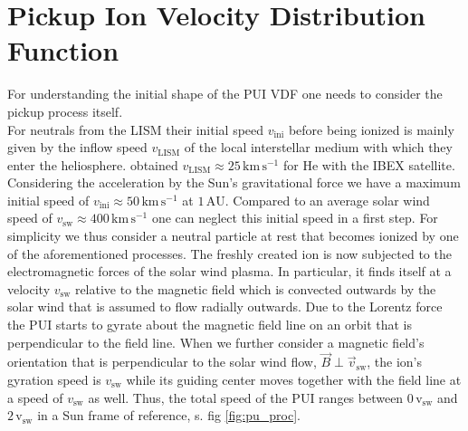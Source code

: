 \section{Pickup Ion Velocity Distribution Function}
\label{sec:theo_vdf}
For understanding the initial shape of the PUI VDF one needs to consider the pickup process itself. \\
For neutrals from the LISM their initial speed $v_{\mathrm{ini}}$ before being ionized is mainly given by the inflow speed $v_{\mathrm{LISM}}$ of the local interstellar medium with which they enter the heliosphere. \citet{schwadron_2015_ibex} obtained $v_{\mathrm{LISM}} \approx 25 \,\mathrm{km\,s^{-1}}$ for $\mathrm{He}$ with the IBEX satellite. Considering the acceleration by the Sun's gravitational force we have a maximum initial speed of $v_{\mathrm{ini}} \approx 50 \,\mathrm{km\,s^{-1}}$ at $1\,\mathrm{AU}$. Compared to an average solar wind speed of $v_{\mathrm{sw}} \approx 400\,\mathrm{km\,s^{-1}}$ one can neglect this initial speed in a first step. For simplicity we thus consider a neutral particle at rest that becomes ionized by one of the aforementioned processes. The freshly created ion is now subjected to the electromagnetic forces of the solar wind plasma. In particular, it finds itself at a velocity $v_{\mathrm{sw}}$ relative to the magnetic field which is convected outwards by the solar wind that is assumed to flow radially outwards. Due to the Lorentz force the PUI starts to gyrate about the magnetic field line on an orbit that is perpendicular to the field line.
When we further consider a magnetic field's orientation that is perpendicular to the solar wind flow, $\vec{B} \perp \vec{v}_{\mathrm{sw}}$, the ion's gyration speed is $v_{\mathrm{sw}}$ while its guiding center moves together with the field line at a speed of $v_{\mathrm{sw}}$ as well.
Thus, the total speed of the PUI ranges between $0\, \mathrm{v_{\mathrm{sw}}} $ and $2 \, \mathrm{v_{\mathrm{sw}}}$ in a Sun frame of reference, s. fig \ref{fig:pu_proc}.

